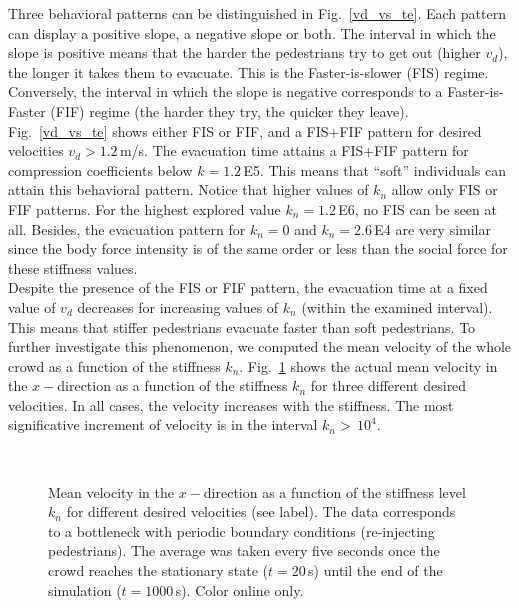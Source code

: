 \documentclass[preprint,12pt]{elsarticle}
\begin{document}
Three behavioral patterns can be distinguished in Fig.~\ref{vd_vs_te}. 
Each pattern can display a positive slope, a negative slope
or both. The interval in which the slope is positive means that the 
harder the pedestrians try to get out (higher $v_d$), the 
longer it takes them to evacuate. This is the Faster-is-slower 
(FIS) regime. Conversely, the interval in which the slope is 
negative  corresponds to a Faster-is-Faster (FIF) regime (the 
harder they try, the quicker they leave).\\

Fig.~\ref{vd_vs_te}  shows either FIS or FIF, and a FIS+FIF pattern
for desired velocities $v_d>1.2\,$m/s. The 
evacuation time attains a FIS+FIF pattern for compression coefficients below 
$k=1.2\,$E5. This means that ``soft'' individuals can attain this 
behavioral pattern.  Notice that higher values of $k_n$ allow 
only FIS or FIF patterns. For the highest explored value $k_n=1.2\,$E6, no 
FIS can be seen at all. Besides, the evacuation pattern for $k_n = 0$ and $k_n 
= 2.6\,$E4 are very similar since the body force intensity is of the same order
or less than the social 
force for these stiffness values. \\

Despite the presence of the FIS or FIF pattern, the evacuation time at a 
fixed value of $v_d$ decreases for increasing values of $k_n$ (within the examined interval). 
This means that stiffer pedestrians evacuate faster than soft pedestrians. 
To further investigate this 
phenomenon, we computed the mean velocity of the whole crowd as a function of the 
stiffness $k_n$. Fig.~\ref{kn_vs_vx_bottleneck} shows the actual mean velocity in the 
$x-$direction as a function of the stiffness $k_n$ for three different desired 
velocities. In all cases, the velocity increases with the stiffness. The most significative 
increment of velocity is in the interval $k_n>\,10^{4}$. \\


\begin{figure}[!htbp]
\centering
    \\
\caption[width=0.47\columnwidth]{Mean velocity in the $x-$direction as a function 
of the stiffness level $k_n$ for different desired velocities (see label). The 
data corresponds to a bottleneck with periodic boundary conditions (re-injecting 
pedestrians). The average was taken every five seconds once the crowd reaches the 
stationary state ($t=20\,$s) until the end of the simulation ($t=1000\,$s). 
Color online only. }
\label{kn_vs_vx_bottleneck}
\end{figure}
\end{document}
